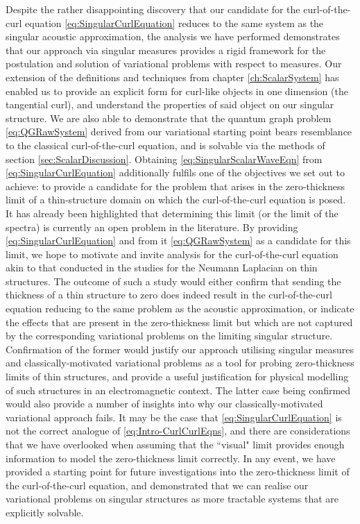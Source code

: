 Despite the rather disappointing discovery that our candidate for the curl-of-the-curl equation \eqref{eq:SingularCurlEquation} reduces to the same system as the singular acoustic approximation, the analysis we have performed demonstrates that our approach via singular measures provides a rigid framework for the postulation and solution of variational problems with respect to measures.
Our extension of the definitions and techniques from chapter \ref{ch:ScalarSystem} has enabled us to provide an explicit form for curl-like objects in one dimension (the tangential curl), and understand the properties of said object on our singular structure.
We are also able to demonstrate that the quantum graph problem \eqref{eq:QGRawSystem} derived from our variational starting point bears resemblance to the classical curl-of-the-curl equation, and is solvable via the methods of section \ref{sec:ScalarDiscussion}.
Obtaining \eqref{eq:SingularScalarWaveEqn} from \eqref{eq:SingularCurlEquation} additionally fulfils one of the objectives we set out to achieve: to provide a candidate for the problem that arises in the zero-thickness limit of a thin-structure domain on which the curl-of-the-curl equation is posed.
It has already been highlighted that determining this limit (or the limit of the spectra) is currently an open problem in the literature.
By providing \eqref{eq:SingularCurlEquation} and from it \eqref{eq:QGRawSystem} as a candidate for this limit, we hope to motivate and invite analysis for the curl-of-the-curl equation akin to that conducted in the studies \cite{kuchment2001convergence, kuchment2003asymptotics, exner2005convergence, post2012spectral} for the Neumann Laplacian on thin structures.
The outcome of such a study would either confirm that sending the thickness of a thin structure to zero does indeed result in the curl-of-the-curl equation reducing to the same problem as the acoustic approximation, or indicate the effects that are present in the zero-thickness limit but which are not captured by the corresponding variational problems on the limiting singular structure.
Confirmation of the former would justify our approach utilising singular measures and classically-motivated variational problems as a tool for probing zero-thickness limits of thin structures, and provide a useful justification for physical modelling of such structures in an electromagnetic context.
The latter case being confirmed would also provide a number of insights into why our classically-motivated variational approach fails.
It may be the case that \eqref{eq:SingularCurlEquation} is not the correct analogue of \eqref{eq:Intro-CurlCurlEqns}, and there are considerations that we have overlooked when assuming that the ``visual" limit provides enough information to model the zero-thickness limit correctly.
In any event, we have provided a starting point for future investigations into the zero-thickness limit of the curl-of-the-curl equation, and demonstrated that we can realise our variational problems on singular structures as more tractable systems that are explicitly solvable.


